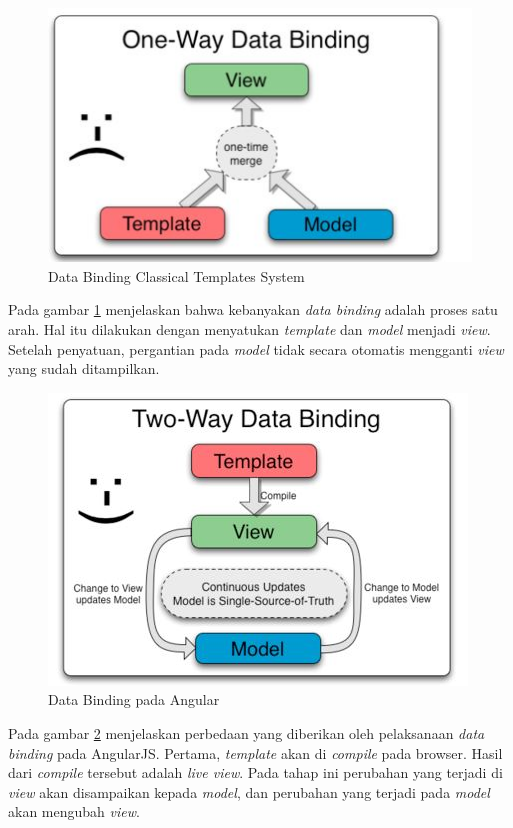 		\begin{figure}[H]
			\centering
			\includegraphics[scale=0.75]{Gambar/Dabin1}
			\caption{Data Binding Classical Templates System}
			\label{fig:dabin1}
		\end{figure}
		Pada gambar \ref{fig:dabin1} menjelaskan bahwa kebanyakan \textit{data binding} adalah proses satu arah. Hal itu dilakukan dengan menyatukan \textit{template} dan \textit{model} menjadi \textit{view}. Setelah penyatuan, pergantian pada \textit{model} tidak secara otomatis mengganti \textit{view} yang sudah ditampilkan.
		\begin{figure}[H]
			\centering
			\includegraphics[scale=0.75]{Gambar/Dabin2}
			\caption{Data Binding pada Angular}
			\label{fig:dabin2}
		\end{figure}
		Pada gambar \ref{fig:dabin2} menjelaskan perbedaan yang diberikan oleh pelaksanaan \textit{data binding} pada AngularJS. Pertama, \textit{template} akan di \textit{compile} pada browser. Hasil dari \textit{compile} tersebut adalah \textit{live view}. Pada tahap ini perubahan yang terjadi di \textit{view} akan disampaikan kepada \textit{model}, dan perubahan yang terjadi pada \textit{model} akan mengubah \textit{view}.
		
